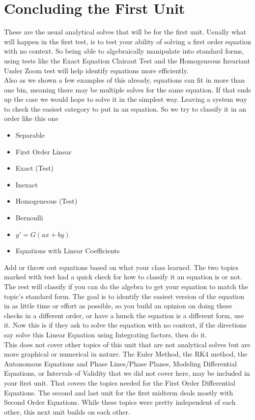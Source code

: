 \documentclass[12pt]{article}
\begin{document}
\section{Concluding the First Unit}

These are the usual analytical solves that will be for the first unit. Usually what will happen in the first test, is to test your ability of solving a first order equation with no context. So being able to algebraically manipulate into standard forms, using tests like the Exact Equation Clairaut Test and the Homogeneous Invariant Under Zoom test will help identify equations more efficiently. \\

Also as we shown a few examples of this already, equations can fit in more than one bin, meaning there may be multiple solves for the same equation. If that ends up the case we would hope to solve it in the simplest way. Leaving a system way to check the easiest category to put in an equation. So we try to classify it in an order like this one

\begin{itemize}
    \item Separable
    \item First Order Linear
    \item Exact (Test)
    \item Inexact
    \item Homogeneous (Test)
    \item Bernoulli
    \item $y'=G(ax+by)$
    \item Equations with Linear Coefficients
\end{itemize}

Add or throw out equations based on what your class learned. The two topics marked with test had a quick check for how to classify it an equation is or not. The rest will classify if you can do the algebra to get your equation to match the topic's standard form. The goal is to identify the easiest version of the equation in as little time or effort as possible, so you build an opinion on doing these checks in a different order, or have a hunch the equation is a different form, use it. Now this is if they ask to solve the equation with no context, if the directions say solve this Linear Equation using Integrating factors, then do it. \\

This does not cover other topics of this unit that are not analytical solves but are more graphical or numerical in nature. The Euler Method, the RK4 method, the Autonomous Equations and Phase Lines/Phase Planes, Modeling Differential Equations, or Intervals of Validity that we did not cover here, may be included in your first unit. That covers the topics needed for the First Order Differential Equations. The second and last unit for the first midterm deals mostly with Second Order Equations. While these topics were pretty independent of each other, this next unit builds on each other.
\end{document}
